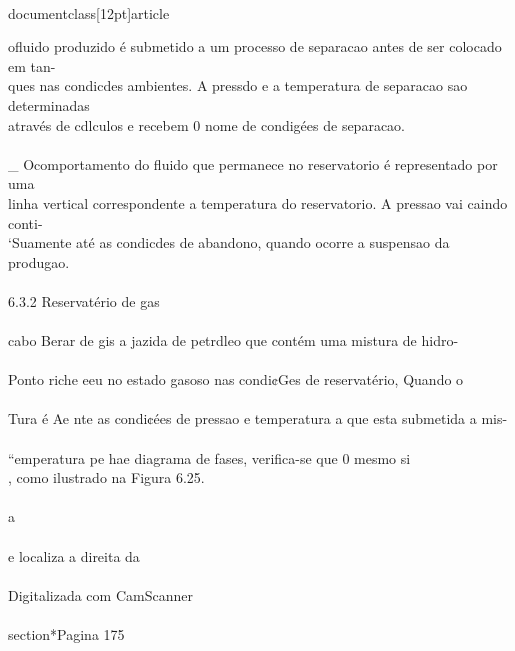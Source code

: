 \\documentclass[12pt]{article}
\begin{document}
ofluido produzido é submetido a um processo de separacao antes de ser colocado em tan-\\
ques nas condicdes ambientes. A pressdo e a temperatura de separacao sao determinadas\\
através de cdlculos e recebem 0 nome de condigées de separacao.\\
\\_ Ocomportamento do fluido que permanece no reservatorio é representado por uma\\
linha vertical correspondente a temperatura do reservatorio. A pressao vai caindo conti-\\
‘Suamente até as condicdes de abandono, quando ocorre a suspensao da produgao.\\
\\
6.3.2 Reservatério de gas\\
\\
cabo Berar de gis a jazida de petrdleo que contém uma mistura de hidro-\\
\\
Ponto riche eeu no estado gasoso nas condi¢Ges de reservatério, Quando o\\
\\
Tura é Ae nte as condi¢ées de pressao e temperatura a que esta submetida a mis-\\
\\
“emperatura pe hae diagrama de fases, verifica-se que 0 mesmo si\\
, como ilustrado na Figura 6.25.\\
\\
a\\
\\
e localiza a direita da\\
\\
Digitalizada com CamScanner\\

\\section*{Pagina 175}
\end{document}
